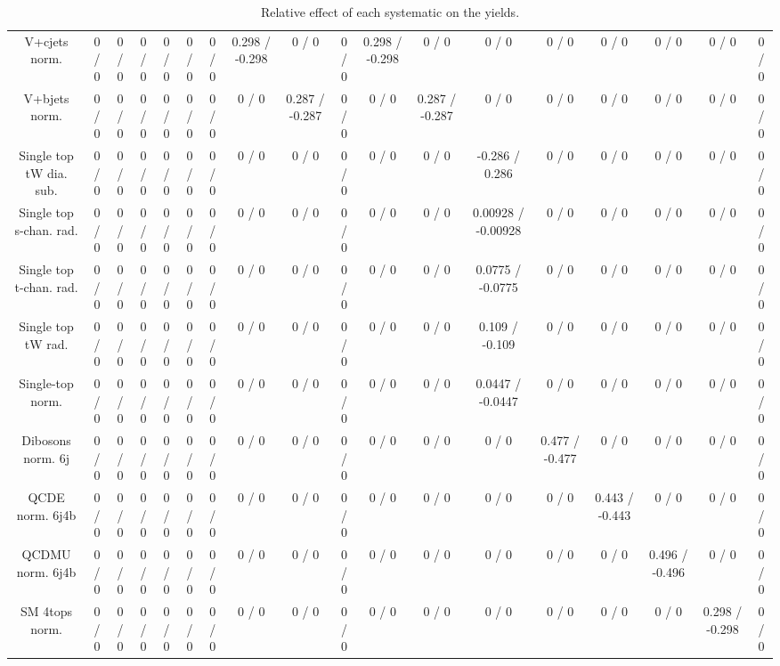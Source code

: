 \documentclass[10pt]{article}
\begin{document}
\begin{table}[htbp]
\begin{center}
\begin{tabular}{|c|c|c|c|c|c|c|c|c|c|c|c|c|c|c|c|c|c|}
  V+cjets norm. & 0 / 0 & 0 / 0 & 0 / 0 & 0 / 0 & 0 / 0 & 0 / 0 & 0.298 / -0.298 & 0 / 0 & 0 / 0 & 0.298 / -0.298 & 0 / 0 & 0 / 0 & 0 / 0 & 0 / 0 & 0 / 0 & 0 / 0 & 0 / 0 \\ 
  V+bjets norm. & 0 / 0 & 0 / 0 & 0 / 0 & 0 / 0 & 0 / 0 & 0 / 0 & 0 / 0 & 0.287 / -0.287 & 0 / 0 & 0 / 0 & 0.287 / -0.287 & 0 / 0 & 0 / 0 & 0 / 0 & 0 / 0 & 0 / 0 & 0 / 0 \\ 
  Single top tW dia. sub. & 0 / 0 & 0 / 0 & 0 / 0 & 0 / 0 & 0 / 0 & 0 / 0 & 0 / 0 & 0 / 0 & 0 / 0 & 0 / 0 & 0 / 0 & -0.286 / 0.286 & 0 / 0 & 0 / 0 & 0 / 0 & 0 / 0 & 0 / 0 \\ 
  Single top s-chan. rad. & 0 / 0 & 0 / 0 & 0 / 0 & 0 / 0 & 0 / 0 & 0 / 0 & 0 / 0 & 0 / 0 & 0 / 0 & 0 / 0 & 0 / 0 & 0.00928 / -0.00928 & 0 / 0 & 0 / 0 & 0 / 0 & 0 / 0 & 0 / 0 \\ 
  Single top t-chan. rad. & 0 / 0 & 0 / 0 & 0 / 0 & 0 / 0 & 0 / 0 & 0 / 0 & 0 / 0 & 0 / 0 & 0 / 0 & 0 / 0 & 0 / 0 & 0.0775 / -0.0775 & 0 / 0 & 0 / 0 & 0 / 0 & 0 / 0 & 0 / 0 \\ 
  Single top tW rad. & 0 / 0 & 0 / 0 & 0 / 0 & 0 / 0 & 0 / 0 & 0 / 0 & 0 / 0 & 0 / 0 & 0 / 0 & 0 / 0 & 0 / 0 & 0.109 / -0.109 & 0 / 0 & 0 / 0 & 0 / 0 & 0 / 0 & 0 / 0 \\ 
  Single-top norm. & 0 / 0 & 0 / 0 & 0 / 0 & 0 / 0 & 0 / 0 & 0 / 0 & 0 / 0 & 0 / 0 & 0 / 0 & 0 / 0 & 0 / 0 & 0.0447 / -0.0447 & 0 / 0 & 0 / 0 & 0 / 0 & 0 / 0 & 0 / 0 \\ 
  Dibosons norm. 6j & 0 / 0 & 0 / 0 & 0 / 0 & 0 / 0 & 0 / 0 & 0 / 0 & 0 / 0 & 0 / 0 & 0 / 0 & 0 / 0 & 0 / 0 & 0 / 0 & 0.477 / -0.477 & 0 / 0 & 0 / 0 & 0 / 0 & 0 / 0 \\ 
  QCDE norm. 6j4b & 0 / 0 & 0 / 0 & 0 / 0 & 0 / 0 & 0 / 0 & 0 / 0 & 0 / 0 & 0 / 0 & 0 / 0 & 0 / 0 & 0 / 0 & 0 / 0 & 0 / 0 & 0.443 / -0.443 & 0 / 0 & 0 / 0 & 0 / 0 \\ 
  QCDMU norm. 6j4b & 0 / 0 & 0 / 0 & 0 / 0 & 0 / 0 & 0 / 0 & 0 / 0 & 0 / 0 & 0 / 0 & 0 / 0 & 0 / 0 & 0 / 0 & 0 / 0 & 0 / 0 & 0 / 0 & 0.496 / -0.496 & 0 / 0 & 0 / 0 \\ 
  SM 4tops norm. & 0 / 0 & 0 / 0 & 0 / 0 & 0 / 0 & 0 / 0 & 0 / 0 & 0 / 0 & 0 / 0 & 0 / 0 & 0 / 0 & 0 / 0 & 0 / 0 & 0 / 0 & 0 / 0 & 0 / 0 & 0.298 / -0.298 & 0 / 0 \\ 
\hline 
\end{tabular} 
\caption{Relative effect of each systematic on the yields.} 
\end{center} 
\end{table} 
\end{document}
